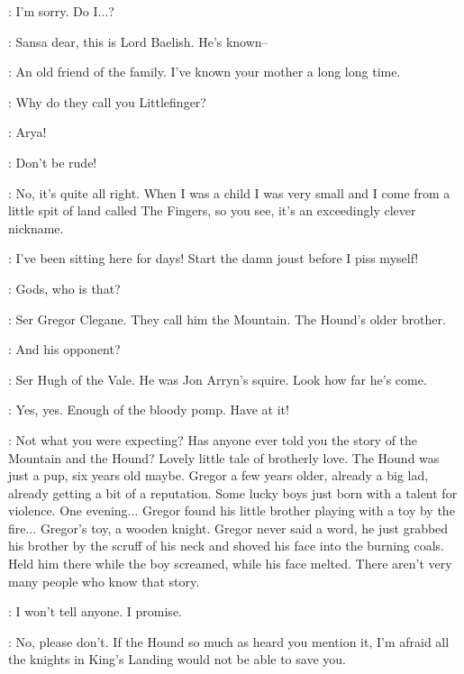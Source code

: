 \SANSA: I'm sorry. Do I$\ldots$? 

\SEPTAMORDANE: Sansa dear, this is Lord Baelish. He's known--

\LITTLEFINGER: An old friend of the family. I've known your mother a long long time. 

\ARYA: Why do they call you Littlefinger? 

\SANSA: Arya! 

\SEPTAMORDANE: Don't be rude! 

\LITTLEFINGER: No, it's quite all right. When I was a child I was very small and I come from a little spit of land called The Fingers, so you see, it's an exceedingly clever nickname. 

\ROBERT: I've been sitting here for days! Start the damn joust before I piss myself! 


\SANSA: Gods, who is that? 

\LITTLEFINGER: Ser Gregor Clegane. They call him the Mountain. The Hound's older brother. 

\SANSA: And his opponent? 

\LITTLEFINGER: Ser Hugh of the Vale. He was Jon Arryn's squire. Look how far he's come. 

\ROBERT: Yes, yes. Enough of the bloody pomp. Have at it! 


\LITTLEFINGER: Not what you were expecting? Has anyone ever told you the story of the Mountain and the Hound? Lovely little tale of brotherly love. The Hound was just a pup, six years old maybe. Gregor a few years older, already a big lad, already getting a bit of a reputation. Some lucky boys just born with a talent for violence. One evening$\ldots$ Gregor found his little brother playing with a toy by the fire$\ldots$ Gregor's toy, a wooden knight. Gregor never said a word, he just grabbed his brother by the scruff of his neck and shoved his face into the burning coals. Held him there while the boy screamed, while his face melted. There aren't very many people who know that story. 

\SANSA: I won't tell anyone. I promise. 

\LITTLEFINGER: No, please don't. If the Hound so much as heard you mention it, I'm afraid all the knights in King's Landing would not be able to save you. 

